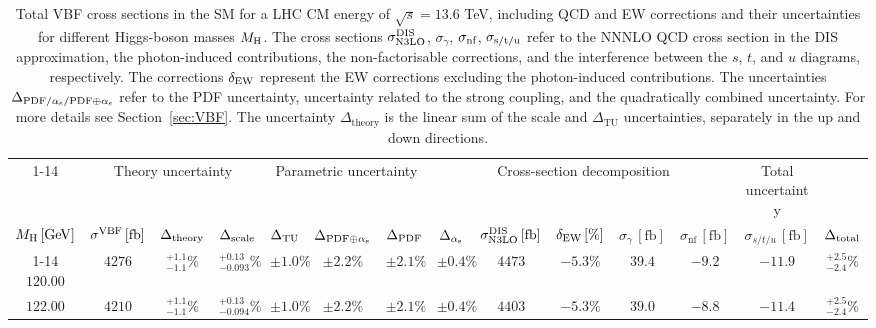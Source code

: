\begin{landscape}
\begin{table}[ht!]
\caption{Total VBF cross sections in the SM for a LHC CM energy of $\sqrt{s}=13.6$ TeV, including QCD and EW corrections
and their uncertainties for different Higgs-boson masses \texorpdfstring{$M_\mathrm{H}$}\MH. 
The cross sections $\sigma_{\mathrm{N3LO}}^{\mathrm{DIS}}$, $\sigma_{\gamma}$, $\sigma_{\mbox{\scriptsize nf}}$, $\sigma_{\mbox{\scriptsize s/t/u}}$ refer to the NNNLO QCD cross section in the DIS approximation, the photon-induced contributions, the non-factorisable corrections, and the interference between the $s$, $t$, and $u$ diagrams, respectively.
The corrections $\delta_{\mathrm{EW}}$ represent the EW corrections excluding the photon-induced contributions.
The uncertainties $\Delta_{\mathrm{PDF}/\alpha_{\mathrm{s}}/\mathrm{PDF\oplus\alpha_{\mathrm{s}}}}$ refer to the PDF uncertainty, uncertainty related to the strong coupling, and the quadratically combined uncertainty.
For more details see Section~\ref{sec:VBF}. The uncertainty $\Delta_{\mathrm{theory}}$ is the linear sum of the scale and $\Delta_{\mathrm{TU}}$ uncertainties, separately in the up and down directions.}
\label{tab:vbf_XStot_136}
\centering
\scriptsize
{\renewcommand{\arraystretch}{1.4}
\begin{tabular}{| cc | ccc | ccc | ccc | cc | c |}
\cline{1-14}
\multicolumn{2}{|c|}{\(\sqrt{s} = 13.6\,\mathrm{TeV}\)} &
\multicolumn{3}{|c|}{Theory uncertainty} &
\multicolumn{3}{|c|}{Parametric uncertainty} &
\multicolumn{5}{|c|}{Cross-section decomposition} &
\multicolumn{1}{c|}{Total uncertainty} \\
\(M_\mathrm{H}\,[\mathrm{GeV}]\) & \(\sigma^{\mathrm{VBF}}\,[\mathrm{fb}]\) &
\(\Delta_{\rm theory}\) &
{\color{black!55}\(\Delta_{\rm scale}\)} & {\color{black!55}\(\Delta_{\rm TU}\)} &
\(\Delta_{\rm PDF\oplus\alpha_{\mathrm{s}}}\) &
{\color{black!55}\(\Delta_{\rm PDF}\)} & {\color{black!55}\(\Delta_{\alpha_{\mathrm{s}}}\)} &
\(\sigma_{\mathrm{N3LO}}^{\mathrm{DIS}}\,[\mathrm{fb}]\) & \(\delta_{\mathrm{EW}}\,[\%]\) & \(\sigma_\gamma\,[\mathrm{fb}]\) & \(\sigma_{\mathrm{nf}}\,[\mathrm{fb}]\) & \(\sigma_{s/t/u}\,[\mathrm{fb}]\) &
\(\Delta_{\rm total}\)
\\
\cline{1-14}
$120.00$ & $4276$ & $^{+1.1}_{-1.1}\%$ & {\color{black!55}$^{+0.13}_{-0.093}\%$} & {\color{black!55}$\pm 1.0\%$} & $\pm 2.2\%$ & {\color{black!55}$\pm 2.1\%$} & {\color{black!55}$\pm 0.4\%$} & $4473$ & $-5.3\%$ & $39.4$ & $-9.2$ & $-11.9$ & $^{+2.5}_{-2.4}\%$ \\
$122.00$ & $4210$ & $^{+1.1}_{-1.1}\%$ & {\color{black!55}$^{+0.13}_{-0.094}\%$} & {\color{black!55}$\pm 1.0\%$} & $\pm 2.2\%$ & {\color{black!55}$\pm 2.1\%$} & {\color{black!55}$\pm 0.4\%$} & $4403$ & $-5.3\%$ & $39.0$ & $-8.8$ & $-11.4$ & $^{+2.5}_{-2.4}\%$ \\

\end{tabular}}
\end{table}
\end{landscape}
